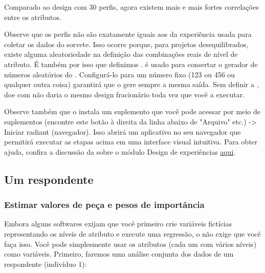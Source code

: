 \documentclass{article}
\begin{document}
Comparado ao design com 30 perfis, agora existem mais e mais fortes correlações entre os atributos.

Observe que os perfis não são exatamente iguais aos da experiência usada para coletar os dados do sorvete. Isso ocorre porque, para projetos desequilibrados, existe alguma aleatoriedade na definição das combinações reais de nível de atributo. É também por isso que definimos .  é usado para consertar o gerador de números aleatórios do \faRProject. Configurá-lo para um número fixo (123 ou 456 ou qualquer outra coisa) garantirá que o \faRProject gere sempre a mesma saída. Sem definir a , doe com  não daria o mesmo design fracionário toda vez que você a executar.

Observe também que o  instala um suplemento que você pode acessar por meio de suplementos (encontre este botão à direita da linha abaixo de "Arquivo" etc.) -> Iniciar radiant (navegador). Isso abrirá um aplicativo no seu navegador que permitirá executar as etapas acima em uma interface visual intuitiva. Para obter ajuda, confira a discussão da  sobre o módulo Design de experiências \href{https://radiant-rstats.github.io/docs/design/doe.html}{aqui}.


\subsection{Um respondente}
\subsubsection{Estimar valores de peça e pesos de importância}

Embora alguns softwares exijam que você primeiro crie variáveis fictícias representando os níveis de atributo e execute uma regressão, o  não exige que você faça isso. Você pode simplesmente usar os atributos (cada um com vários níveis) como variáveis. Primeiro, faremos uma análise conjunta dos dados de um respondente (indivíduo 1):
\end{document}
